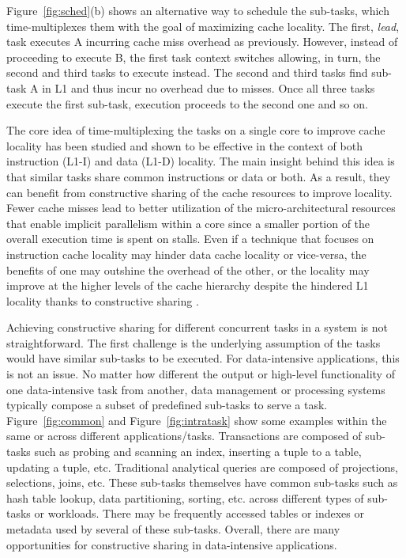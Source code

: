 \documentclass[11pt,dvipdfm]{article}
\newcommand{\reffig}[1]{Figure~\ref{fig:#1}}
\begin{document}
\reffig{sched}(b) shows an alternative way to schedule the sub-tasks,
which time-multiplexes them with the goal of maximizing cache locality.
The first, \textit{lead}, task executes A incurring cache miss overhead as previously.
However, instead of proceeding to execute B, the first task context switches allowing,
in turn, the second and third tasks to execute instead.
The second and third tasks find sub-task A in L1 and thus incur no overhead due to misses.
Once all three tasks execute the first sub-task, execution proceeds to the second one and so on.

The core idea of time-multiplexing the tasks on a single core to improve cache locality
has been studied and shown to be effective in the context of both
instruction (L1-I) and data (L1-D) \cite{AttaTTAM13, HarizopoulosA04, HarizopoulosSA05, LarusP02} locality.
The main insight behind this idea is that similar tasks share common instructions or data or both.
As a result, they can benefit from constructive sharing of the cache resources to improve locality.
Fewer cache misses lead to better utilization of the micro-architectural resources
that enable implicit parallelism within a core
since a smaller portion of the overall execution time is spent on stalls. 
Even if a technique that focuses on instruction cache locality may hinder data cache locality or vice-versa,
the benefits of one may outshine the overhead of the other,
or the locality may improve at the higher levels of the cache hierarchy
despite the hindered L1 locality thanks to constructive sharing \cite{TozunAAM14}.

Achieving constructive sharing for different concurrent tasks in a system is not straightforward.
The first challenge is the underlying assumption of the tasks would have similar sub-tasks to be executed.
For data-intensive applications, this is not an issue.
No matter how different the output or high-level functionality of one data-intensive task from another,
data management or processing systems typically compose a subset of predefined sub-tasks to serve a task.
\reffig{common} and \reffig{intratask}
show some examples within the same or across different applications/tasks.
Transactions are composed of sub-tasks such as probing and scanning an index,
inserting a tuple to a table, updating a tuple, etc.
Traditional analytical queries are composed of projections, selections, joins, etc.
These sub-tasks themselves have common sub-tasks such as hash table lookup, data partitioning, sorting, etc.
across different types of sub-tasks or workloads.
There may be frequently accessed tables or indexes or metadata used by several of these sub-tasks.
Overall, there are many opportunities for constructive sharing in data-intensive applications.
\end{document}
